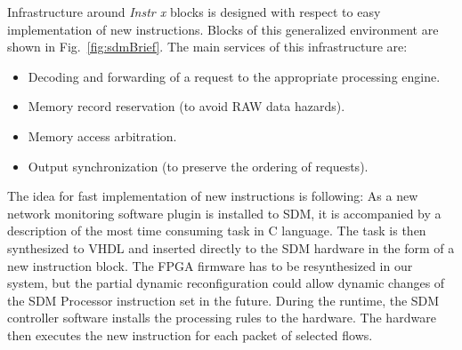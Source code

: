 Infrastructure around \emph{Instr x} blocks is designed with respect to easy implementation of new instructions.
Blocks of this generalized environment are shown in Fig.~\ref{fig:sdmBrief}. The main services of this
infrastructure are:

\begin{itemize}
\item Decoding and forwarding of a request to the appropriate processing engine.
\item Memory record reservation (to avoid RAW data hazards).
\item Memory access arbitration.
\item Output synchronization (to preserve the ordering of requests).
\end{itemize}

The idea for fast implementation of new instructions is following:
As a new network monitoring software plugin is installed to SDM, it is accompanied by a description of the most time consuming task in C language.
The task is then synthesized to VHDL and inserted directly to the SDM hardware in the form of a new instruction block. 
The FPGA firmware has to be resynthesized in our system, but the partial dynamic reconfiguration could allow dynamic 
changes of the SDM Processor instruction set in the future.
During the runtime, the SDM controller software installs the processing rules to the hardware.
The hardware then executes the new instruction for each packet of selected flows.

